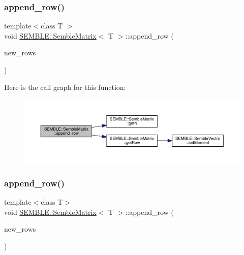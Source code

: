 \subsubsection{\texorpdfstring{append\_row()}{append\_row()}\hspace{0.1cm}{\footnotesize\ttfamily [3/4]}}
{\footnotesize\ttfamily template$<$class T $>$ \\
void \mbox{\hyperlink{structSEMBLE_1_1SembleMatrix}{S\+E\+M\+B\+L\+E\+::\+Semble\+Matrix}}$<$ T $>$\+::append\+\_\+row (\begin{DoxyParamCaption}\item[{const \mbox{\hyperlink{structSEMBLE_1_1SembleMatrix}{Semble\+Matrix}}$<$ T $>$ \&}]{new\+\_\+rows }\end{DoxyParamCaption})}

Here is the call graph for this function\+:
\nopagebreak
\begin{figure}[H]
\begin{center}
\leavevmode
\includegraphics[width=350pt]{df/d87/structSEMBLE_1_1SembleMatrix_a823a02fc92f954965ca57bd5cbe72cfe_cgraph}
\end{center}
\end{figure}
\mbox{\label{structSEMBLE_1_1SembleMatrix_a823a02fc92f954965ca57bd5cbe72cfe}} 
\subsubsection{\texorpdfstring{append\_row()}{append\_row()}\hspace{0.1cm}{\footnotesize\ttfamily [4/4]}}
{\footnotesize\ttfamily template$<$class T$>$ \\
void \mbox{\hyperlink{structSEMBLE_1_1SembleMatrix}{S\+E\+M\+B\+L\+E\+::\+Semble\+Matrix}}$<$ T $>$\+::append\+\_\+row (\begin{DoxyParamCaption}\item[{const \mbox{\hyperlink{structSEMBLE_1_1SembleMatrix}{Semble\+Matrix}}$<$ T $>$ \&}]{new\+\_\+rows }\end{DoxyParamCaption})}

